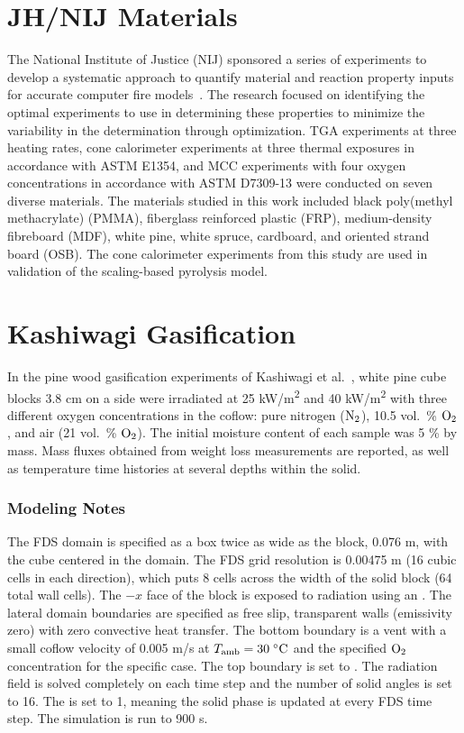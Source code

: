 \FloatBarrier

\section{JH/NIJ Materials}
\label{JH_NIJ_Description}


The National Institute of Justice (NIJ) sponsored a series of experiments to develop a systematic approach to quantify material and reaction property inputs for accurate computer fire models~\cite{Lattimer:NIJ19}.
The research focused on identifying the optimal experiments to use in determining these properties to minimize the variability in the determination through optimization.
TGA experiments at three heating rates, cone calorimeter experiments at three thermal exposures in accordance with ASTM E1354, and MCC experiments with four oxygen concentrations in accordance with ASTM D7309-13 were conducted on seven diverse materials.
The materials studied in this work included black poly(methyl methacrylate) (PMMA), fiberglass reinforced plastic (FRP), medium-density fibreboard (MDF), white pine, white spruce, cardboard, and oriented strand board (OSB).
The cone calorimeter experiments from this study are used in validation of the scaling-based pyrolysis model.


\section{Kashiwagi Gasification}
\label{Kashiwagi_Gasification_Description}

In the pine wood gasification experiments of Kashiwagi et al.~\cite{Kashiwagi:1987}, white pine cube blocks 3.8 cm on a side were irradiated at 25 \si{kW/m^2} and 40 \si{kW/m^2} with three different oxygen concentrations in the coflow: pure nitrogen (${\rm N}_2$), 10.5 vol.~\% ${\rm O}_2$, and air (21 vol.~\% ${\rm O}_2$).  The initial moisture content of each sample was 5 \% by mass. Mass fluxes obtained from weight loss measurements are reported, as well as temperature time histories at several depths within the solid.

\subsubsection{Modeling Notes}

The FDS domain is specified as a box twice as wide as the block, 0.076 m, with the cube centered in the domain.  The FDS grid resolution is 0.00475 m (16 cubic cells in each direction), which puts 8 cells across the width of the solid block (64 total wall cells).  The $-x$ face of the block is exposed to radiation using an .  The lateral domain boundaries are specified as free slip, transparent walls (emissivity zero) with zero convective heat transfer.  The bottom boundary is a vent with a small coflow velocity of 0.005 m/s at $T_{\rm amb} = 30\;\si{\degreeCelsius}$ and the specified ${\rm O}_2$ concentration for the specific case.  The top boundary is set to .  The radiation field is solved completely on each time step and the number of solid angles is set to 16.  The  is set to 1, meaning the solid phase is updated at every FDS time step.  The simulation is run to 900 s.

